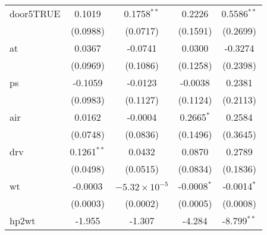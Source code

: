 \begin{tabular}{lcccc}
   door5TRUE                                   & 0.1019                                      & 0.1758$^{**}$          & 0.2226                & 0.5586$^{**}$         \\
                                               & (0.0988)                                    & (0.0717)               & (0.1591)              & (0.2699)              \\
   at                                          & 0.0367                                      & -0.0741                & 0.0300                & -0.3274               \\
                                               & (0.0969)                                    & (0.1086)               & (0.1258)              & (0.2398)              \\
   ps                                          & -0.1059                                     & -0.0123                & -0.0038               & 0.2381                \\
                                               & (0.0983)                                    & (0.1127)               & (0.1124)              & (0.2113)              \\
   air                                         & 0.0162                                      & -0.0004                & 0.2665$^{*}$          & 0.2584                \\
                                               & (0.0748)                                    & (0.0836)               & (0.1496)              & (0.3645)              \\
   drv                                         & 0.1261$^{**}$                               & 0.0432                 & 0.0870                & 0.2789                \\
                                               & (0.0498)                                    & (0.0515)               & (0.0834)              & (0.1836)              \\
   wt                                          & -0.0003                                     & $-5.32\times 10^{-5}$  & -0.0008$^{*}$         & -0.0014$^{*}$         \\
                                               & (0.0003)                                    & (0.0002)               & (0.0005)              & (0.0008)              \\
   hp2wt                                       & -1.955                                      & -1.307                 & -4.284                & -8.799$^{**}$         \\

\end{tabular}
